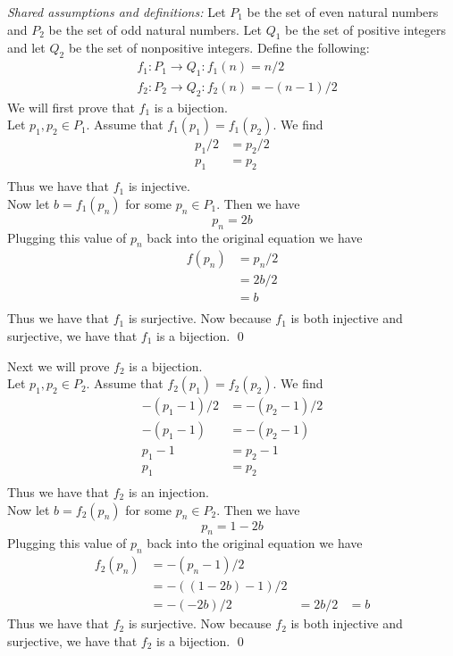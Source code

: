 \documentclass{article}
\begin{document}
\emph{Shared assumptions and definitions:} Let $P_1$ be the set of even natural numbers and $P_2$ be the set of odd natural numbers. Let $Q_1$ be the set of positive integers and let $Q_2$ be the set of nonpositive integers. Define the following:
\begin{align*}
    &f_1: P_1 \rightarrow Q_1 : f_1(n) = n/2\\
    &f_2: P_2 \rightarrow Q_2 : f_2(n) = -(n - 1)/2
\end{align*}
We will first prove that $f_1$ is a bijection.\\
\proof Let $p_1, p_2 \in P_1$. Assume that $f_1(p_1) = f_1(p_2)$. We find
\begin{align*}
    p_1/2 &= p_2/2\\
    p_1 &= p_2\\
\end{align*}
Thus we have that $f_1$ is injective.\\
\indent Now let $b = f_1(p_n)$ for some $p_n \in P_1$. Then we have
\[
p_n = 2b
\]
Plugging this value of $p_n$ back into the original equation we have
\begin{align*}
    f(p_n) &= p_n/2\\
    &= 2b/2\\
    &= b\\
\end{align*}
Thus we have that $f_1$ is surjective. Now because $f_1$ is both injective and surjective, we have that $f_1$ is a bijection. \qed

Next we will prove $f_2$ is a bijection.\\
\proof Let $p_1, p_2 \in P_2$. Assume that $f_2(p_1) = f_2(p_2)$. We find
\begin{align*}
    -(p_1 - 1)/2 &= -(p_2 - 1)/2\\
    -(p_1 - 1) &= -(p_2 - 1)\\
    p_1 - 1 &= p_2 - 1\\
    p_1 &= p_2\\
\end{align*}
Thus we have that $f_2$ is an injection.\\
\indent Now let $b = f_2(p_n)$ for some $p_n \in P_2$. Then we have
\[
p_n = 1 - 2b
\]
Plugging this value of $p_n$ back into the original equation we have
\begin{align*}
    f_2(p_n) &= -(p_n - 1)/2\\
    &= -((1 - 2b) - 1)/2\\
    &= -(-2b)/2
    &= 2b/2
    &= b
\end{align*}
Thus we have that $f_2$ is surjective. Now because $f_2$ is both injective and surjective, we have that $f_2$ is a bijection. \qed
\end{document}
